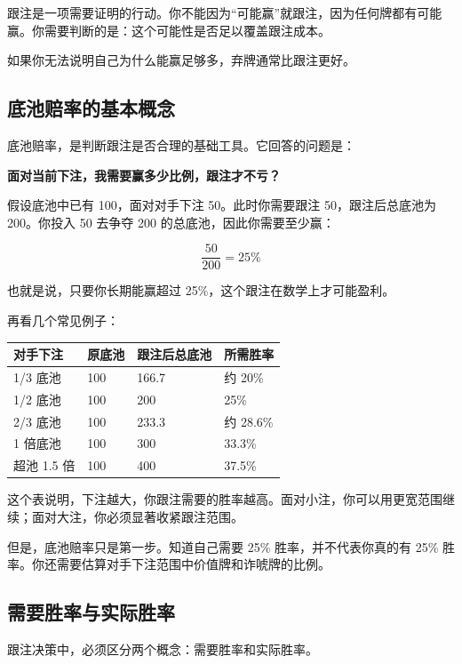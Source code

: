 跟注是一项需要证明的行动。你不能因为“可能赢”就跟注，因为任何牌都有可能赢。你需要判断的是：这个可能性是否足以覆盖跟注成本。

如果你无法说明自己为什么能赢足够多，弃牌通常比跟注更好。

\subsection{底池赔率的基本概念}

底池赔率，是判断跟注是否合理的基础工具。它回答的问题是：

\begin{center}
\textbf{面对当前下注，我需要赢多少比例，跟注才不亏？}
\end{center}

假设底池中已有 100，面对对手下注 50。此时你需要跟注 50，跟注后总底池为 200。你投入 50 去争夺 200 的总底池，因此你需要至少赢：

\[
\frac{50}{200} = 25\%
\]

也就是说，只要你长期能赢超过 25\%，这个跟注在数学上才可能盈利。

再看几个常见例子：

\begin{center}
\begin{tabular}{llll}
\toprule
\textbf{对手下注} & \textbf{原底池} & \textbf{跟注后总底池} & \textbf{所需胜率} \\
\midrule
1/3 底池 & 100 & 166.7 & 约 20\% \\
1/2 底池 & 100 & 200 & 25\% \\
2/3 底池 & 100 & 233.3 & 约 28.6\% \\
1 倍底池 & 100 & 300 & 33.3\% \\
超池 1.5 倍 & 100 & 400 & 37.5\% \\
\bottomrule
\end{tabular}
\end{center}

这个表说明，下注越大，你跟注需要的胜率越高。面对小注，你可以用更宽范围继续；面对大注，你必须显著收紧跟注范围。

但是，底池赔率只是第一步。知道自己需要 25\% 胜率，并不代表你真的有 25\% 胜率。你还需要估算对手下注范围中价值牌和诈唬牌的比例。

\subsection{需要胜率与实际胜率}

跟注决策中，必须区分两个概念：需要胜率和实际胜率。


